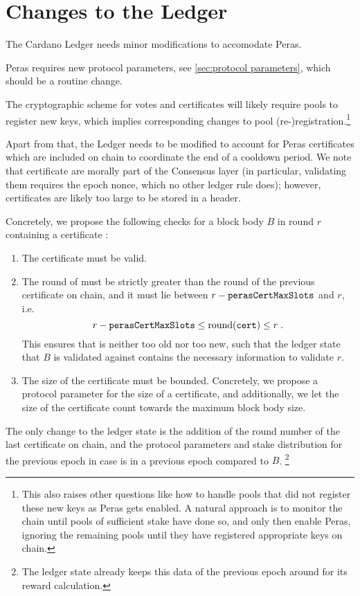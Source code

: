 \section{Changes to the Ledger}\label{sec:ledger changes}

The Cardano Ledger \parencite{shelley-ledger-specs,cardano-formal-ledger-specs} needs minor modifications to accomodate Peras.

Peras requires new protocol parameters, see \cref{sec:protocol parameters}, which should be a routine change.

The cryptographic scheme for votes and certificates \parencite{peras-cert-report} will likely require pools to register new keys, which implies corresponding changes to pool (re-)registration.\footnote{
  This also raises other questions like how to handle pools that did not register these new keys as Peras gets enabled.
  A natural approach is to monitor the chain until pools of sufficient stake have done so, and only then enable Peras, ignoring the remaining pools until they have registered appropriate keys on chain.}

Apart from that, the Ledger needs to be modified to account for Peras certificates which are included on chain to coordinate the end of a cooldown period.
We note that certificate are morally part of the Consensus layer (in particular, validating them requires the epoch nonce, which no other ledger rule does); however, certificates are likely too large to be stored in a header.

Concretely, we propose the following checks for a block body $B$ in round $r$ containing a certificate \cert{}:
\begin{enumerate}
\item
  The certificate \cert{} must be valid.
\item
  The round of \cert{} must be strictly greater than the round of the previous certificate on chain, and it must lie between $r-\mathtt{perasCertMaxSlots}$ and $r$, i.e.\
  \[ r-\mathtt{perasCertMaxSlots} \le \operatorname{round}(\mathtt{cert}) \le r \;. \]
  This ensures that \cert{} is neither too old nor too new, such that the ledger state that $B$ is validated against contains the necessary information to validate $r$.
\item
  The size of the certificate must be bounded.
  Concretely, we propose a protocol parameter \perasCertSizeLimit{} for the size of a certificate, and additionally, we let the size of the certificate count towards the maximum block body size.
\end{enumerate}
The only change to the ledger state is the addition of the round number of the last certificate on chain, and the protocol parameters and stake distribution for the previous epoch in case \cert{} is in a previous epoch compared to $B$.%
\footnote{The ledger state already keeps this data of the previous epoch around for its reward calculation.}

